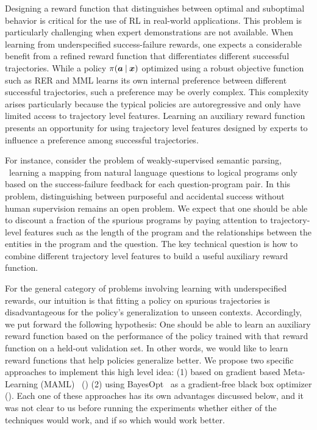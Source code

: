 Designing a reward function that distinguishes between optimal and
suboptimal behavior is critical for the use of RL in
real-world applications. This problem is particularly challenging when
expert demonstrations are not available. When learning from
underspecified success-failure rewards, one expects a considerable
benefit from a refined reward function that differentiates
different successful trajectories. While a policy $\pi({\bm{a}}\:\vert\:{\bm{x}})$
optimized using a robust objective function such as RER and MML learns
its own internal preference between different successful trajectories,
such a preference may be overly complex. This complexity arises particularly
because the typical policies are autoregressive and only have limited
access to trajectory level features. Learning an auxiliary reward
function presents an opportunity for using trajectory level features
designed by experts to influence a preference among successful
trajectories.

For instance, consider the problem of weakly-supervised semantic
parsing, \ie~learning a mapping from natural language questions to
logical programs only based on the success-failure feedback for each
question-program pair. In this problem, distinguishing between
purposeful and accidental success without human supervision remains an
open problem. We expect that one should be able to discount a fraction
of the spurious programs by paying attention to trajectory-level
features such as the length of the program and the relationships
between the entities in the program and the question. The key
technical question is how to combine different trajectory level
features to build a useful auxiliary reward function.

For the general category of problems involving learning with underspecified
rewards, our intuition is that fitting a policy on spurious
trajectories is disadvantageous for the policy's generalization to
unseen contexts. Accordingly, we put forward the following hypothesis:
One should be able to learn an auxiliary reward function based on the
performance of the policy trained with that reward function on a
held-out validation set. In other words, we would like to learn reward
functions that help policies generalize better.  We propose two
specific approaches to implement this high level idea: (1) based on
gradient based Meta-Learning (MAML)~\cite{finn2017model}
() (2) using BayesOpt~\cite{snoek2012practical}
as a gradient-free black box optimizer
(). Each one of these approaches has its own
advantages discussed below, and it was not clear to us before running
the experiments whether either of the techniques would work, and if so
which would work better.

